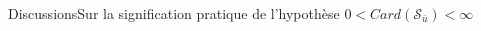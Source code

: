 \documentclass[compress,10pt,aspectratio=169]{beamer}
\begin{document}
\begin{frame}{Discussions}{Sur la signification pratique de l'hypothèse $0<Card(\mathcal{S}_{\bar{u}})<\infty$}
\begin{columns}
\begin{column}{0.33\textwidth}
\centering
\end{column}

\begin{column}{0.33\textwidth}
\centering
\end{column}
\end{columns}
\vspace{0.3cm}
\end{frame}
\end{document}
